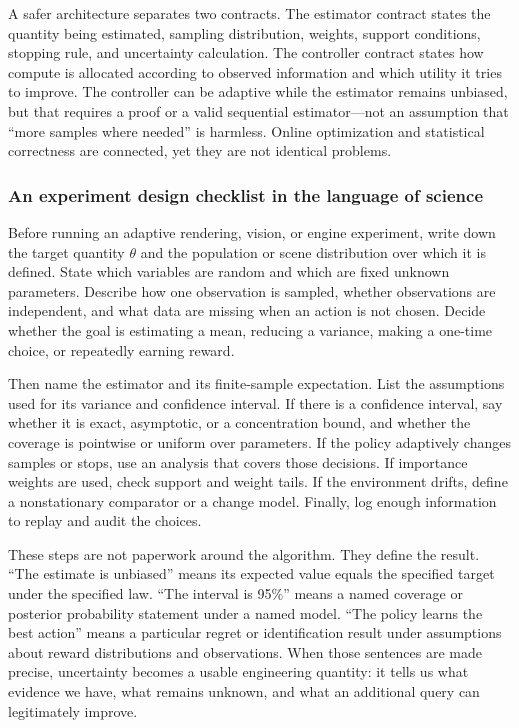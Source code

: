 A safer architecture separates two contracts. The estimator contract states the quantity being estimated, sampling distribution, weights, support conditions, stopping rule, and uncertainty calculation. The controller contract states how compute is allocated according to observed information and which utility it tries to improve. The controller can be adaptive while the estimator remains unbiased, but that requires a proof or a valid sequential estimator---not an assumption that ``more samples where needed'' is harmless. Online optimization and statistical correctness are connected, yet they are not identical problems.

\subsubsection{An experiment design checklist in the language of science}\label{an-experiment-design-checklist-in-the-language-of-science}

Before running an adaptive rendering, vision, or engine experiment, write down the target quantity \(\theta\) and the population or scene distribution over which it is defined. State which variables are random and which are fixed unknown parameters. Describe how one observation is sampled, whether observations are independent, and what data are missing when an action is not chosen. Decide whether the goal is estimating a mean, reducing a variance, making a one-time choice, or repeatedly earning reward.

Then name the estimator and its finite-sample expectation. List the assumptions used for its variance and confidence interval. If there is a confidence interval, say whether it is exact, asymptotic, or a concentration bound, and whether the coverage is pointwise or uniform over parameters. If the policy adaptively changes samples or stops, use an analysis that covers those decisions. If importance weights are used, check support and weight tails. If the environment drifts, define a nonstationary comparator or a change model. Finally, log enough information to replay and audit the choices.

These steps are not paperwork around the algorithm. They define the result. ``The estimate is unbiased'' means its expected value equals the specified target under the specified law. ``The interval is 95\%'' means a named coverage or posterior probability statement under a named model. ``The policy learns the best action'' means a particular regret or identification result under assumptions about reward distributions and observations. When those sentences are made precise, uncertainty becomes a usable engineering quantity: it tells us what evidence we have, what remains unknown, and what an additional query can legitimately improve.

